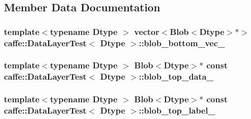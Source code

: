 \subsection{Member Data Documentation}
\hypertarget{classcaffe_1_1_data_layer_test_af547e93d91fa20aef8d1026b4b006a86}{
\subsubsection[{blob\+\_\+bottom\+\_\+vec\+\_\+}]{\setlength{\rightskip}{0pt plus 5cm}template$<$typename Dtype $>$ vector$<${\bf Blob}$<$Dtype$>$$\ast$$>$ {\bf caffe\+::\+Data\+Layer\+Test}$<$ Dtype $>$\+::blob\+\_\+bottom\+\_\+vec\+\_\+\hspace{0.3cm}{\ttfamily [protected]}}}\label{classcaffe_1_1_data_layer_test_af547e93d91fa20aef8d1026b4b006a86}
\hypertarget{classcaffe_1_1_data_layer_test_a5810c2d8664d032fd3b96dd9eeac24d8}{
\subsubsection[{blob\+\_\+top\+\_\+data\+\_\+}]{\setlength{\rightskip}{0pt plus 5cm}template$<$typename Dtype $>$ {\bf Blob}$<$Dtype$>$$\ast$ const {\bf caffe\+::\+Data\+Layer\+Test}$<$ Dtype $>$\+::blob\+\_\+top\+\_\+data\+\_\+\hspace{0.3cm}{\ttfamily [protected]}}}\label{classcaffe_1_1_data_layer_test_a5810c2d8664d032fd3b96dd9eeac24d8}
\hypertarget{classcaffe_1_1_data_layer_test_a56fd4aed58fbf6c4a24373e9df1d732a}{
\subsubsection[{blob\+\_\+top\+\_\+label\+\_\+}]{\setlength{\rightskip}{0pt plus 5cm}template$<$typename Dtype $>$ {\bf Blob}$<$Dtype$>$$\ast$ const {\bf caffe\+::\+Data\+Layer\+Test}$<$ Dtype $>$\+::blob\+\_\+top\+\_\+label\+\_\+\hspace{0.3cm}{\ttfamily [protected]}}}\label{classcaffe_1_1_data_layer_test_a56fd4aed58fbf6c4a24373e9df1d732a}
